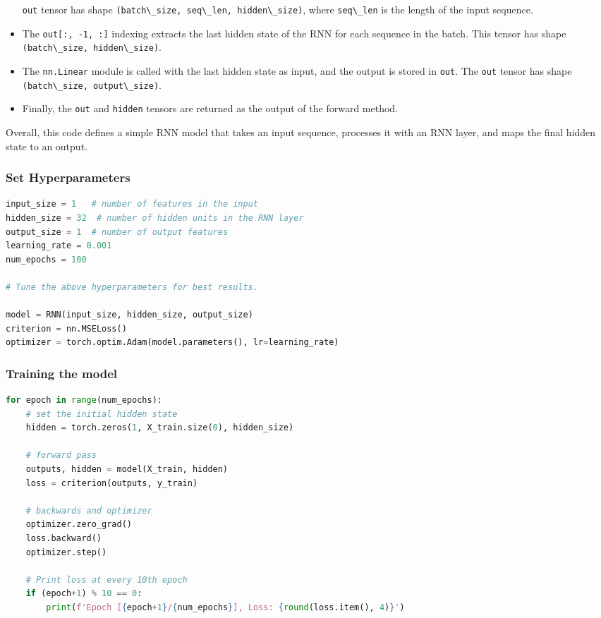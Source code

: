 \begin{itemize}
  \lstinline{out} tensor has shape
  \lstinline{(batch\_size, seq\_len, hidden\_size)}, where
  \lstinline{seq\_len} is the length of the input
  sequence.
\item
  The \lstinline{out[:, -1, :]} indexing extracts the last
  hidden state of the RNN for each sequence in the batch. This tensor
  has shape \lstinline{(batch\_size, hidden\_size)}.
\item
  The \lstinline{nn.Linear} module is called with the last
  hidden state as input, and the output is stored in
  \lstinline{out}. The \lstinline{out}
  tensor has shape
  \lstinline{(batch\_size, output\_size)}.
\item
  Finally, the \lstinline{out} and
  \lstinline{hidden} tensors are returned as the output of
  the forward method.
\end{itemize}

Overall, this code defines a simple RNN model that takes an input
sequence, processes it with an RNN layer, and maps the final hidden
state to an output.

\subsubsection{Set Hyperparameters}\label{set-hyperparameters}

\begin{lstlisting}[language=Python]
input_size = 1   # number of features in the input
hidden_size = 32  # number of hidden units in the RNN layer
output_size = 1  # number of output features
learning_rate = 0.001
num_epochs = 100

# Tune the above hyperparameters for best results.

model = RNN(input_size, hidden_size, output_size)
criterion = nn.MSELoss()
optimizer = torch.optim.Adam(model.parameters(), lr=learning_rate)
\end{lstlisting}

\subsubsection{Training the model}\label{training-the-model}

\begin{lstlisting}[language=Python]
for epoch in range(num_epochs):
    # set the initial hidden state
    hidden = torch.zeros(1, X_train.size(0), hidden_size)

    # forward pass
    outputs, hidden = model(X_train, hidden)
    loss = criterion(outputs, y_train)

    # backwards and optimizer
    optimizer.zero_grad()
    loss.backward()
    optimizer.step()

    # Print loss at every 10th epoch
    if (epoch+1) % 10 == 0:
        print(f'Epoch [{epoch+1}/{num_epochs}], Loss: {round(loss.item(), 4)}')
\end{lstlisting}

